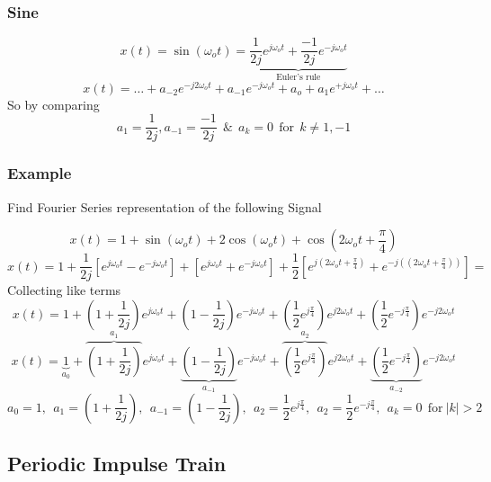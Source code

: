 \documentclass[11pt,a4paper]{article}
\theoremstyle{definition}
\begin{document}
\subsubsection{Sine}
\[
    x(t) = \sin(\omega_ot) = \underbrace{\dfrac{1}{2j} e^{j\omega_ot} + \dfrac{-1}{2j} e^{-j\omega_ot}}_{\text{Euler's rule}}
\]
\[
    x(t) = \dots + a_{-2}e^{-j2\omega_ot}
    + a_{-1}e^{-j\omega_ot} + a_o + a_{1}e^{+j\omega_ot} + \dots
\]
So by comparing 
\[
    \boxed{a_1 = \frac{1}{2j},a_{-1} =\frac{-1}{2j}  \ \ \& \ \ a_k = 0  \ \
    \text{for} \ \ k \neq 1, -1 }
\]
\subsubsection{Example}
Find Fourier Series representation of the following Signal 

\[
    x(t) = 1 + \sin(\omega_ot) + 2 \cos(\omega_ot) + \cos(2\omega_ot + \frac{\pi}{4})
\]
\[
    x(t) = 1 + \frac{1}{2j}[e^{j\omega_ot}-e^{-j\omega_ot}] + 
    [e^{j\omega_ot} + e^{-j\omega_ot}] + \frac{1}{2} [e^{j(2\omega_ot+\frac{\pi}{4})} 
    + e^{-j((2\omega_ot+\frac{\pi}{4}))}] = 
\]
Collecting like terms
\[
    x(t) = 1 + (1 + \frac{1}{2j}) e^{j\omega_ot} +(1 - \frac{1}{2j}) e^{-j\omega_ot} 
    + (\frac{1}{2} e^{j\frac{\pi}{4}}) e^{j2\omega_ot} + (\frac{1}{2} e^{-j\frac{\pi}{4}}) e^{-j2\omega_ot}
\]
\[
    x(t) = \underbrace{1}_{a_0} + \overbrace{(1 + \frac{1}{2j})}^{a_1} e^{j\omega_ot} 
    + \underbrace{(1 - \frac{1}{2j})}_{a_{-1}} e^{-j\omega_ot} 
    + \overbrace{(\frac{1}{2} e^{j\frac{\pi}{4}})}^{a_2} e^{j2\omega_ot} +
    \underbrace{(\frac{1}{2} e^{-j\frac{\pi}{4}})}_{a_{-2}} e^{-j2\omega_ot}
\]
\[
    a_0 = 1, \ \ a_1 = (1+\frac{1}{2j}), \ \ a_{-1} = (1-\frac{1}{2j}),  \ \ 
    a_2 = \frac{1}{2} e^{j\frac{\pi}{4}}, \ \ a_2 = \frac{1}{2} e^{-j\frac{\pi}{4}},
    \ \ a_k = 0 \ \ \text{for} \ |k| > 2 
\]
\subsection{Periodic Impulse Train}
\end{document}
